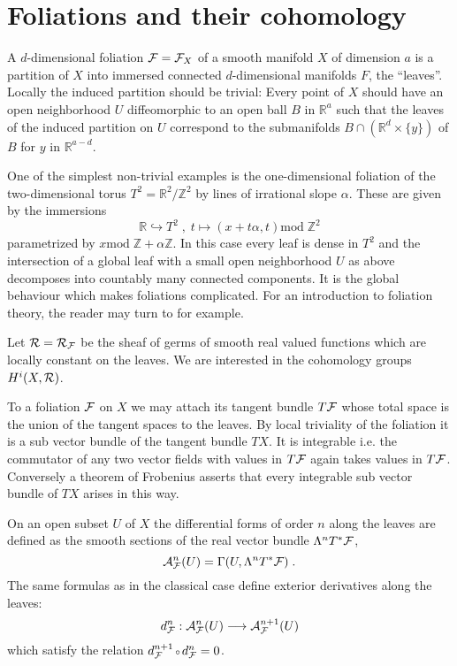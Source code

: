 \documentclass[11pt,leqno]{article}
\newcommand{\R}{{\mathbb{R}}}
\newcommand{\Z}{{\mathbb{Z}}}
\renewcommand{\mod}{\mathrm{mod}\;}
\newcommand{\Ah}{{\cal A}}
\newcommand{\Fh}{{\cal F}}
\newcommand{\Rh}{{\cal R}}
\newcommand{\verk}{\mbox{\scriptsize $\,\circ\,$}}
\begin{document}
\section{Foliations and their cohomology}
A $d$-dimensional foliation $\Fh = \Fh_X$ of a smooth manifold $X$ of dimension $a$ is a partition of $X$ into immersed connected $d$-dimensional manifolds $F$, the ``leaves''. Locally the induced partition should be trivial: Every point of $X$ should have an open neighborhood $U$ diffeomorphic to an open ball $B$ in $\R^a$ such that the leaves of the induced partition on $U$ correspond to the submanifolds $B \cap (\R^d \times \{ y \})$ of $B$ for $y$ in $\R^{a-d}$.

One of the simplest non-trivial examples is the one-dimensional foliation of the two-dimensional torus $T^2 = \R^2 / \Z^2$ by lines of irrational slope $\alpha$. These are given by the immersions
\[
\R \hookrightarrow T^2 \; , \; t \mapsto (x + t \alpha , t) \mod \Z^2
\]
parametrized by $x \mod \Z + \alpha \Z$. In this case every leaf is dense in $T^2$ and the intersection of a global leaf with a small open neighborhood $U$ as above decomposes into countably many connected components. It is the global behaviour which makes foliations complicated. For an introduction to foliation theory, the reader may turn to \cite{Go} for example.

Let $\Rh = \Rh_{\Fh}$ be the sheaf of germs of smooth real valued functions which are locally constant on the leaves. We are interested in the cohomology groups $H^i (X, \Rh)$. 

To a foliation $\Fh$ on $X$ we may attach its tangent bundle $T \Fh$ whose total space is the union of the tangent spaces to the leaves. By local triviality of the foliation it is a sub vector bundle of the tangent bundle $TX$. It is integrable i.e. the commutator of any two vector fields with values in $T \Fh$ again takes values in $T\Fh$. Conversely a theorem of Frobenius asserts that every integrable sub vector bundle of $TX$ arises in this way.

On an open subset $U$ of $X$ the differential forms of order $n$ along the leaves are defined as the smooth sections of the real vector bundle $\Lambda^n T^* \Fh$, 
\[
\Ah^n_{\Fh} (U) = \Gamma (U, \Lambda^n T^* \Fh) \; .
\]
The same formulas as in the classical case define exterior derivatives along the leaves:
\[
d^n_{\Fh} : \Ah^n_{\Fh} (U) \longrightarrow \Ah^{n+1}_{\Fh} (U)
\]
which satisfy the relation $d^{n+1}_{\Fh} \verk d^n_{\Fh} = 0$. 
\end{document}
